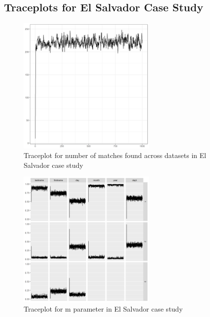 \documentclass[ba]{imsart}
\begin{document}
\clearpage
	
	\hypertarget{appendix-es}{%
		\subsection{Traceplots for El Salvador Case Study}\label{app:appendix-es}}
	
	\begin{figure}[!h]
		\begin{center}
			\includegraphics[width=0.6\textwidth]{../notes/figures/el_salvador/overlap_trace} 
			\caption{Traceplot for number of matches found across datasets in El Salvador case study}\label{fig:overlap_trace}
		\end{center}
	\end{figure}
	
	\begin{figure}[!h]
		\begin{center}
			\includegraphics[width=0.6\textwidth]{../notes/figures/el_salvador/m_trace} 
			\caption{Traceplot for m parameter in El Salvador case study}\label{fig:m_trace}
		\end{center}
	\end{figure}
	
\end{document}
